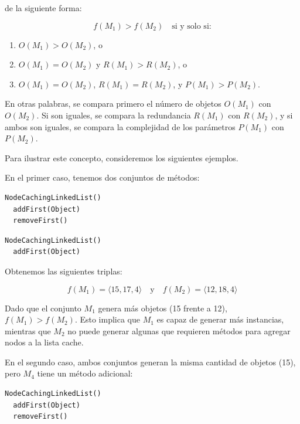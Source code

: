 de la siguiente forma:

\[
f(M_1) > f(M_2) \quad \text{si y solo si:}
\]

\begin{enumerate}
    \item \( O(M_1) > O(M_2) \), o
    \item \( O(M_1) = O(M_2) \) y \( R(M_1) > R(M_2) \), o
    \item \( O(M_1) = O(M_2) \), \( R(M_1) = R(M_2) \), y \( P(M_1) > P(M_2) \).
\end{enumerate}

En otras palabras, se compara primero el número de objetos \( O(M_1) \) con \( O(M_2) \). Si son iguales, se compara la redundancia \( R(M_1) \) con \( R(M_2) \), y si ambos son iguales, se compara la complejidad de los parámetros \( P(M_1) \) con \( P(M_2) \).

Para ilustrar este concepto, consideremos los siguientes ejemplos.

En el primer caso, tenemos dos conjuntos de métodos:\\

\begin{lstlisting}[numbers=none,label=fig:NCLbuilders1, caption=Conjunto de métodos \( M_1 \)]
  NodeCachingLinkedList()
  addFirst(Object)
  removeFirst()
\end{lstlisting} 

\begin{lstlisting}[numbers=none,label=fig:NCLbuilders2, caption=Conjunto de métodos \( M_2 \)]
  NodeCachingLinkedList()
  addFirst(Object)
\end{lstlisting}

Obtenemos las siguientes triplas:

\[
f(M_1) = \langle 15, 17, 4 \rangle \quad \text{y} \quad f(M_2) = \langle 12, 18, 4 \rangle
\]


Dado que el conjunto \( M_1 \) genera más objetos (15 frente a 12), \( f(M_1) > f(M_2) \). Esto implica que \( M_1 \) es capaz de generar más instancias, mientras que \( M_2 \) no puede generar algunas que requieren métodos para agregar nodos a la lista cache.

En el segundo caso, ambos conjuntos generan la misma cantidad de objetos (15), pero \( M_4 \) tiene un método adicional:\\

\begin{lstlisting}[numbers=none,label=fig:NCLbuilders3, caption=Conjunto de métodos \( M_3 \)]
  NodeCachingLinkedList()
  addFirst(Object)
  removeFirst()
\end{lstlisting}

